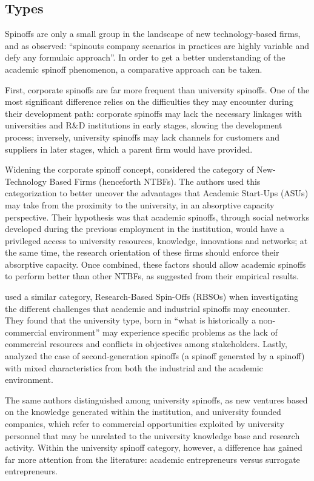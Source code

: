 \subsection{Types}

Spinoffs are only a small group in the landscape of new technology-based firms, and as \citet{Franklin2001} observed: \enquote{spinouts company scenarios in practices are highly variable and defy any formulaic approach}. In order to get a better understanding of the academic spinoff phenomenon, a comparative approach can be taken.

First, corporate spinoffs are far more frequent than university spinoffs. One of the most significant difference relies on the difficulties they may encounter during their development path: corporate spinoffs may lack the necessary linkages with universities and R\&D institutions in early stages, slowing the development process; inversely, university spinoffs may lack channels for customers and suppliers in later stages, which a parent firm would have provided.

Widening the corporate spinoff concept, \citet{Colombo2010} considered the category of New-Technology Based Firms (henceforth NTBFs). The authors used this categorization to better uncover the advantages that Academic Start-Ups (ASUs) may take from the proximity to the university, in an absorptive capacity perspective. Their hypothesis was that academic spinoffs, through social networks developed during the previous employment in the institution, would have a privileged access to university resources, knowledge, innovations and networks; at the same time, the research orientation of these firms should enforce their absorptive capacity. Once combined, these factors should allow academic spinoffs to perform better than other NTBFs, as suggested from their empirical results.

\citet{Mustar2006} used a similar category, Research-Based Spin-Offs (RBSOs) when investigating the different challenges that academic and industrial spinoffs may encounter. They found that the university type, born in \enquote{what is historically a non-commercial environment} may experience specific problems as the lack of commercial resources and conflicts in objectives among stakeholders. Lastly, \citet{Leitch2005} analyzed the case of  second-generation spinoffs (a spinoff generated by a spinoff) with mixed characteristics from both the industrial and the academic environment.

The same authors distinguished among university spinoffs, as new ventures based on the knowledge generated within the institution, and university founded companies, which refer to commercial opportunities exploited by university personnel that may be unrelated to the university knowledge base and research activity. Within the university spinoff category, however, a difference has gained far more attention from the literature: academic entrepreneurs versus surrogate entrepreneurs.

